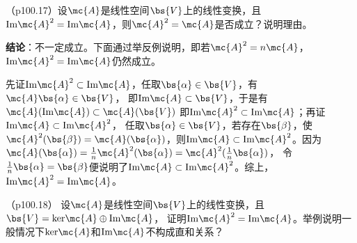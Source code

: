 \documentclass[12pt, a4paper, oneside, UTF8]{ctexbook}
\begin{document}
\begin{question}
（p100.17）设$\mc{A}$是线性空间$\bs{V}$上的线性变换，且$\mathrm{Im} \mc{A}^2=\mathrm{Im} \mc{A}$，则$\mc{A}^2=\mc{A}$是否成立？说明理由。
\end{question}

\begin{solution}
\textbf{结论}：不一定成立。下面通过举反例说明，即若$\mc{A}^2=n\mc{A}$，$\mathrm{Im}\mc{A}^2=\mathrm{Im}\mc{A}$仍然成立。

先证$\mathrm{Im}\mc{A}^2 \subset \mathrm{Im}\mc{A}$，任取$\bs{\alpha} \in \bs{V}$，有$\mc{A}\bs{\alpha} \in \bs{V}$，
即$\mathrm{Im}\mc{A} \subset \bs{V}$，于是有$\mc{A}(\mathrm{Im}\mc{A}) \subset \mc{A}(\bs{V})$
即$\mathrm{Im}\mc{A}^2 \subset \mathrm{Im}\mc{A}$；再证$\mathrm{Im}\mc{A} \subset \mathrm{Im}\mc{A}^2$，
任取$\bs{\alpha} \in \bs{V}$，若存在$\bs{\beta}$，使$\mc{A}^2(\bs{\beta})=\mc{A}(\bs{\alpha})$，则$\mathrm{Im}\mc{A} \subset \mathrm{Im}\mc{A}^2$。因为$\mc{A}(\bs{\alpha})=\frac{1}{n}\mc{A}^2(\bs{\alpha})=\mc{A}^2(\frac{1}{n}\bs{\alpha})$，
令$\frac{1}{n}\bs{\alpha}=\bs{\beta}$便说明了$\mathrm{Im}\mc{A} \subset \mathrm{Im}\mc{A}^2$。综上，$\mathrm{Im}\mc{A}^2=\mathrm{Im}\mc{A}$。

\end{solution}

\begin{question}（p100.18）
    设$\mc{A}$是线性空间$\bs{V}$上的线性变换，且$\bs{V}=\mathrm{ker}\mc{A} \oplus  \mathrm{Im} \mc{A}$，
    证明$\mathrm{Im}\mc{A}^2=\mathrm{Im}\mc{A}$。举例说明一般情况下$\mathrm{ker}\mc{A}$和$\mathrm{Im}\mc{A}$不构成直和关系？
    
\end{question}
\end{document}
